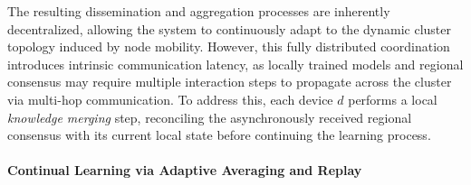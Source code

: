 \documentclass[conference]{IEEEtran}
\theoremstyle{plain}
\theoremstyle{definition}
\begin{document}
The resulting dissemination and aggregation processes are inherently decentralized, 
 allowing the system to continuously adapt to the dynamic cluster topology induced by node mobility. 
However, 
 this fully distributed coordination introduces intrinsic communication latency, 
 as locally trained models and regional consensus may require multiple interaction steps to propagate across the cluster via multi-hop communication. 
To address this, 
 each device $d$ performs a local \emph{knowledge merging} step, 
 reconciling the asynchronously received regional consensus with its current local state before continuing the learning process.

\paragraph{Continual Learning via Adaptive Averaging and Replay}

\end{document}

